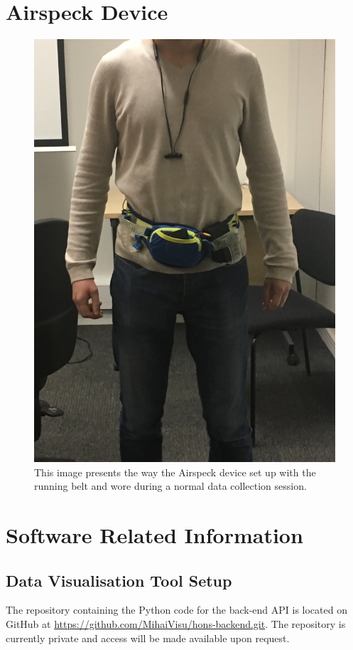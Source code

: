 \documentclass[bsc,frontabs,twoside,singlespacing, parskip,deptreport]{infthesis}     %
\begin{document}
\begin{appendices}

\chapter{Airspeck Device}

\begin{figure}[h!]
  \center
  \includegraphics[width=0.6\columnwidth]{airspeck_on_me.jpg}
  \caption{This image presents the way the Airspeck device set up with the running belt and wore during a normal data collection session.}
  \label{fig:airspeck_on_me}
\end{figure}

\chapter{Software Related Information}


\section{Data Visualisation Tool Setup}
\label{sec:api-setup}

The repository containing the Python code for the back-end API is located on GitHub at \url{https://github.com/MihaiVisu/hons-backend.git}. The repository is currently private and access will be made available upon request.


\end{appendices}
\end{document}
